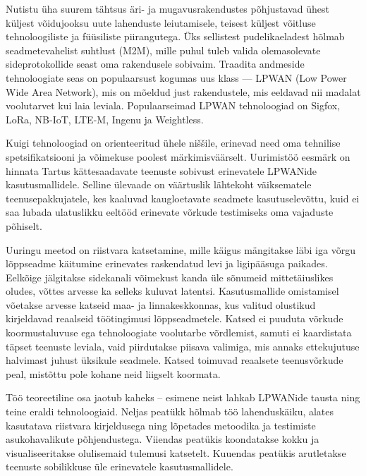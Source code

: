 \documentclass[12pt]{article}
\newcommand{\TODO}{\todo[inline]}
\begin{document}
Nutistu üha suurem tähtsus äri- ja mugavusrakendustes põhjustavad ühest küljest võidujooksu uute lahenduste leiutamisele, teisest küljest võitluse tehnoloogiliste ja füüsiliste piirangutega.
Üks sellistest pudelikaeladest hõlmab seadmetevahelist suhtlust (M2M), mille puhul tuleb valida olemasolevate sideprotokollide seast oma rakendusele sobivaim.
Traadita andmeside tehnoloogiate seas on populaarsust kogumas uus klass — LPWAN (Low Power Wide Area Network), mis on mõeldud just rakendustele, mis eeldavad nii madalat voolutarvet kui laia leviala.
Populaarseimad LPWAN tehnoloogiad on Sigfox, LoRa, NB-IoT, LTE-M, Ingenu ja Weightless.

Kuigi tehnoloogiad on orienteeritud ühele niššile, erinevad need oma tehnilise spetsifikatsiooni ja võimekuse poolest märkimisväärselt.
Uurimistöö eesmärk on hinnata Tartus kättesaadavate teenuste sobivust erinevatele LPWANide kasutusmallidele.
Selline ülevaade on väärtuslik lähtekoht väiksematele teenusepakkujatele, kes kaaluvad kaugloetavate seadmete kasutuselevõttu, kuid ei saa lubada ulatuslikku eeltööd erinevate võrkude testimiseks oma vajaduste põhiselt.

Uuringu meetod on riistvara katsetamine, mille käigus mängitakse läbi iga võrgu lõppseadme käitumine erinevates raskendatud levi ja ligipääsuga paikades.
Eelkõige jälgitakse sidekanali võimekust kanda üle sõnumeid mittetäiuslikes oludes, võttes arvesse ka selleks kuluvat latentsi.
Kasutusmallide omistamisel võetakse arvesse katseid maa- ja linnakeskkonnas, kus valitud olustikud kirjeldavad reaalseid töötingimusi lõppseadmetele.
Katsed ei puuduta võrkude koormustaluvuse ega tehnoloogiate voolutarbe võrdlemist, samuti ei kaardistata täpset teenuste leviala, vaid piirdutakse piisava valimiga, mis annaks ettekujutuse halvimast juhust üksikule seadmele.
Katsed toimuvad reaalsete teenusvõrkude peal, mistõttu pole kohane neid liigselt koormata.

Töö teoreetiline osa jaotub kaheks -- esimene neist lahkab LPWANide tausta ning teine eraldi tehnoloogiaid.
Neljas peatükk hõlmab töö lahenduskäiku, alates kasutatava riistvara kirjeldusega ning lõpetades metoodika ja testimiste asukohavalikute põhjendustega.
Viiendas peatükis koondatakse kokku ja visualiseeritakse olulisemaid tulemusi katsetelt.
Kuuendas peatükis arutletakse teenuste sobilikkuse üle erinevatele kasutusmallidele.
\end{document}
